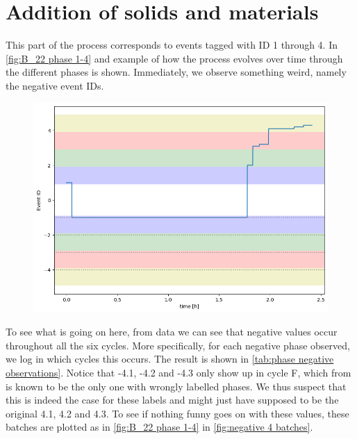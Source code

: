 \documentclass[../Thesis.tex]{subfiles}
\begin{document}
\section{Addition of solids and materials}
This part of the process corresponds to events tagged with ID 1 through 4. In \autoref{fig:B_22 phase 1-4} and example of how the process evolves over time through the different phases is shown. Immediately, we observe something weird, namely the negative event IDs.

\begin{figure}[h]
    \centering
    \includegraphics[width=.7\linewidth]{figures/Multiple cycles data/Adding of solids/B_22 long waiting.png}
    \caption{}
    \label{fig:B_22 phase 1-4}
\end{figure}

To see what is going on here, from data we can see that negative values occur throughout all the six cycles. More specifically, for each negative phase observed, we log in which cycles this occurs. The result is shown in \autoref{tab:phase negative observations}. Notice that -4.1, -4.2 and -4.3 only show up in cycle F, which from \cite{benchmark-model-to-generate-batch-process-data} is known to be the only one with wrongly labelled phases. We thus suspect that this is indeed the case for these labels and might just have supposed to be the original 4.1, 4.2 and 4.3. To see if nothing funny goes on with these values, these batches are plotted as in \autoref{fig:B_22 phase 1-4} in \autoref{fig:negative 4 batches}.

\end{document}
